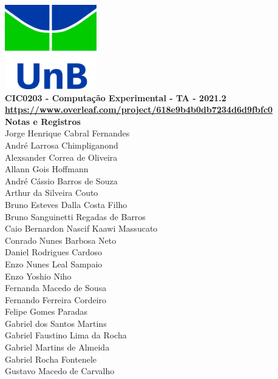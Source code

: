 \documentclass[12pt]{book}
\begin{document}
\clearpage
\thispagestyle{empty}

\begin{titlepage}
\begin{center}
 {\huge\bfseries \includegraphics[width=4cm]{unb-logo.jpg}\\
	CIC0203 - Computação Experimental - TA - 2021.2\\\url{https://www.overleaf.com/project/618e9b4b0db7234d6d9fbfc0}\\
	Notas e Registros\\}
 \vspace{1.5cm}
{\large	%
	Jorge Henrique Cabral Fernandes}\\
	André Larrosa Chimpliganond\\
	Alexsander Correa de Oliveira\\
	Allann Gois Hoffmann\\
	André Cássio Barros de Souza\\
	Arthur da Silveira Couto\\
	Bruno Esteves Dalla Costa Filho\\
	Bruno Sanguinetti Regadas de Barros\\
	Caio Bernardon Nascif Kaawi Massucato\\
	Conrado Nunes Barbosa Neto\\
	Daniel Rodrigues Cardoso\\
	Enzo Nunes Leal Sampaio\\
	Enzo Yoshio Niho\\
	Fernanda Macedo de Sousa \\
	Fernando Ferreira Cordeiro \\
	Felipe Gomes Paradas\\
	Gabriel dos Santos Martins\\
	Gabriel Faustino Lima da Rocha\\
	Gabriel Martins de Almeida\\
	Gabriel Rocha Fontenele\\
	Gustavo Macedo de Carvalho\\

\end{center}
\end{titlepage}
\end{document}

